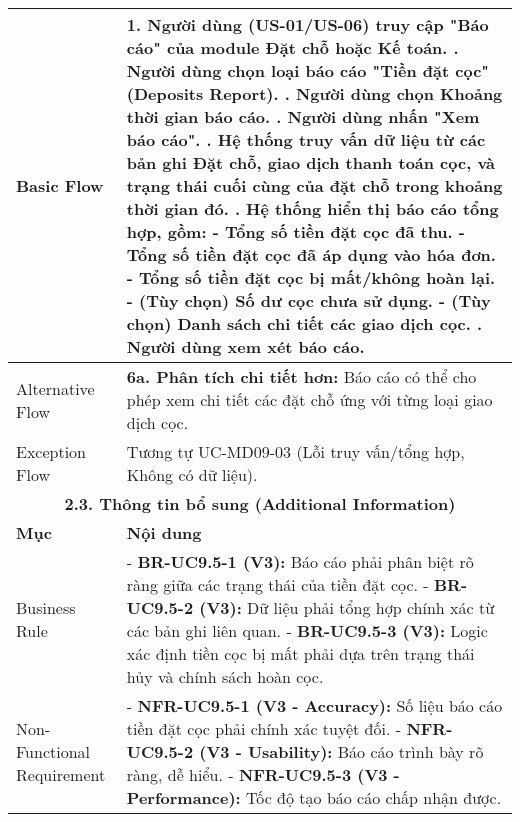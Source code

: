 \begin{longtable}{|m{4cm}|p{11cm}|}
Basic Flow & 1. Người dùng (US-01/US-06) truy cập "Báo cáo" của module Đặt chỗ hoặc Kế toán. \newline 2. Người dùng chọn loại báo cáo "Tiền đặt cọc" (Deposits Report). \newline 3. Người dùng chọn Khoảng thời gian báo cáo. \newline 4. Người dùng nhấn "Xem báo cáo". \newline 5. Hệ thống truy vấn dữ liệu từ các bản ghi Đặt chỗ, giao dịch thanh toán cọc, và trạng thái cuối cùng của đặt chỗ trong khoảng thời gian đó. \newline 6. Hệ thống hiển thị báo cáo tổng hợp, gồm: \newline    - Tổng số tiền đặt cọc đã thu. \newline    - Tổng số tiền đặt cọc đã áp dụng vào hóa đơn. \newline    - Tổng số tiền đặt cọc bị mất/không hoàn lại. \newline    - (Tùy chọn) Số dư cọc chưa sử dụng. \newline    - (Tùy chọn) Danh sách chi tiết các giao dịch cọc. \newline 7. Người dùng xem xét báo cáo. \\
\hline
Alternative Flow & \textbf{6a. Phân tích chi tiết hơn:} Báo cáo có thể cho phép xem chi tiết các đặt chỗ ứng với từng loại giao dịch cọc. \\
\hline
Exception Flow & Tương tự UC-MD09-03 (Lỗi truy vấn/tổng hợp, Không có dữ liệu). \\
\hline
\multicolumn{2}{|c|}{\textbf{2.3. Thông tin bổ sung (Additional Information)}} \\
\hline
\textbf{Mục} & \textbf{Nội dung} \\
\hline
Business Rule & - \textbf{BR-UC9.5-1 (V3):} Báo cáo phải phân biệt rõ ràng giữa các trạng thái của tiền đặt cọc. \newline - \textbf{BR-UC9.5-2 (V3):} Dữ liệu phải tổng hợp chính xác từ các bản ghi liên quan. \newline - \textbf{BR-UC9.5-3 (V3):} Logic xác định tiền cọc bị mất phải dựa trên trạng thái hủy và chính sách hoàn cọc. \\
\hline
Non-Functional Requirement & - \textbf{NFR-UC9.5-1 (V3 - Accuracy):} Số liệu báo cáo tiền đặt cọc phải chính xác tuyệt đối. \newline - \textbf{NFR-UC9.5-2 (V3 - Usability):} Báo cáo trình bày rõ ràng, dễ hiểu. \newline - \textbf{NFR-UC9.5-3 (V3 - Performance):} Tốc độ tạo báo cáo chấp nhận được. \\
\hline
\end{longtable}

